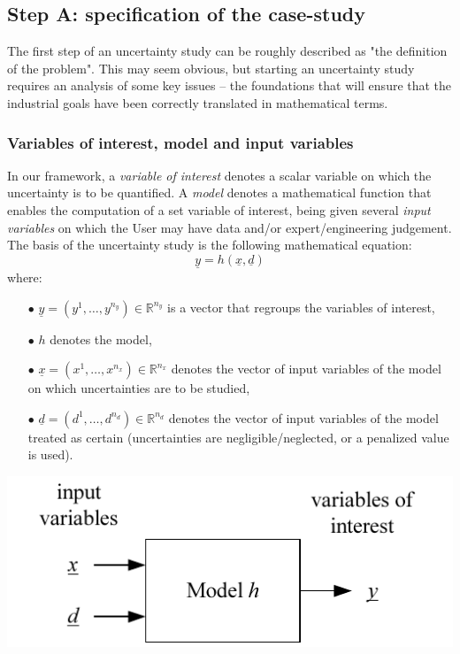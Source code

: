 \subsection{Step A: specification of the case-study}

The first step of an uncertainty study can be roughly described as "the definition of the problem". This may seem obvious, but starting an uncertainty study requires an analysis of some key issues -- the foundations that will ensure that the industrial goals have been correctly translated in mathematical terms.

\subsubsection{Variables of interest, model and input variables}

In our framework, a {\em variable of interest} denotes a scalar variable on which the uncertainty is to be quantified. A {\em model} denotes a mathematical function that enables the computation of a set variable of interest, being given several {\em input variables} on which the User may have data and/or expert/engineering judgement. The basis of the uncertainty study is the following mathematical equation:
$$
\underline{y} = h \left( \underline{x},\underline{d} \right)
$$
where:
\begin{itemize}
\item[$\bullet$] $\underline{y} = \left( y^1,\ldots,y^{n_y} \right) \in \mathbb{R}^{n_y}$ is a vector that regroups the variables of interest,
\item[$\bullet$] $h$ denotes the model,
\item[$\bullet$] $\underline{x} = \left( x^1,\ldots,x^{n_x} \right) \in \mathbb{R}^{n_x}$ denotes the vector of input variables of the model on which uncertainties are to be studied,
\item[$\bullet$] $\underline{d}= \left( d^1,\ldots,d^{n_d} \right) \in \mathbb{R}^{n_d}$ denotes the vector of input variables of the model treated as certain (uncertainties are negligible/neglected, or a penalized value is used).
\end{itemize}

\begin{center}
  \includegraphics[scale=0.8]{flow.pdf}
\end{center}

